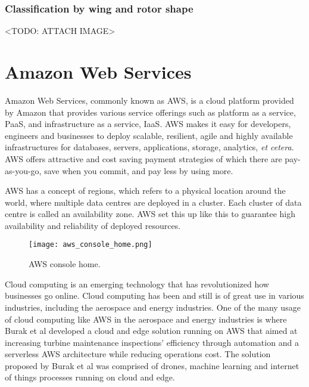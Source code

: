 


\subsubsection*{Classification by wing and rotor shape}

<TODO: ATTACH IMAGE>





\section{Amazon Web Services}
\label{sec:aws}

Amazon Web Services, commonly known as AWS, is a cloud platform provided by Amazon that provides various service offerings such as platform as a service, PaaS, and infrastructure as a service, IaaS\cite{awswhatisaws2022}. AWS makes it easy for developers, engineers and businesses to deploy scalable, resilient, agile and highly available infrastructures for databases, servers, applications, storage, analytics, \textit{et cetera}. AWS offers attractive and cost saving payment strategies of which there are pay-as-you-go, save when you commit, and pay less by using more\cite{awspricing2022}.

AWS has a concept of regions, which refers to a physical location around the world, where multiple data centres are deployed in a cluster. Each cluster of data centre is called an availability zone\cite{awsregionsandazs}. AWS set this up like this to guarantee high availability and reliability of deployed resources.

\begin{figure}[H]
    \centering \texttt{[image: aws\_console\_home.png]}
    \caption{AWS console home.}
    \label{fig:aws-console-home}
\end{figure}

Cloud computing is an emerging technology that has revolutionized how businesses go online. Cloud computing has been and still is of great use in various industries, including the aerospace and energy industries. One of the many usage of cloud computing like AWS in the aerospace and energy industries is where Burak et al developed a cloud and edge solution running on AWS that aimed at increasing turbine maintenance inspections' efficiency through automation and a serverless AWS architecture while reducing operations cost\cite{burakawswindfarm2021}. The solution proposed by Burak et al was comprised of drones, machine learning and internet of things processes running on cloud and edge.

